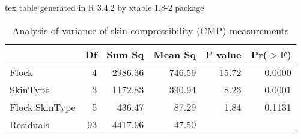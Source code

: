 tex table generated in R 3.4.2 by xtable 1.8-2 package
\begin{table}[ht]
\centering
\caption{Analysis of variance of skin compressibility (CMP) measurements}
\label{tab:cmpaov}
\begin{tabular}{lrrrrr}
  \hline
 & Df & Sum Sq & Mean Sq & F value & Pr($>$F) \\ 
  \hline
Flock          & 4 & 2986.36 & 746.59 & 15.72 & 0.0000 \\ 
  SkinType       & 3 & 1172.83 & 390.94 & 8.23 & 0.0001 \\ 
  Flock:SkinType & 5 & 436.47 & 87.29 & 1.84 & 0.1131 \\ 
  Residuals      & 93 & 4417.96 & 47.50 &  &  \\ 
   \hline
\end{tabular}
\end{table}

